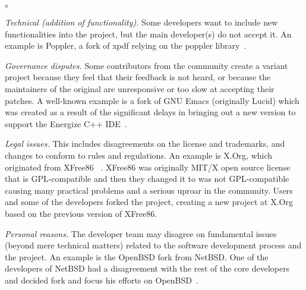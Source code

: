 \begin{list}{$\circ$}{}
   \item \textit{Technical (addition of functionality).} Some developers want to include new functionalities into the project, but the main developer(s) do not accept it. An example is \textsf{Poppler}, a fork of \textsf{xpdf} relying on the \textsf{poppler} library~\cite{Gregorio:2012}.

    \item \textit{Governance disputes.} Some contributors from the community create a variant project because they feel that their feedback is not heard, or because the maintainers of the original are unresponsive or too slow at accepting their patches. A well-known example is a fork of \textsf{GNU Emacs} (originally \textsf{Lucid}) which was created as a result of the significant delays in bringing out a new version to support the Energize C++ IDE~\cite{Wheeler:2015Forking}.

\item \textit{Legal issues.} This includes disagreements on the license and trademarks, and changes to conform to rules and regulations. An example is \textsf{X.Org}, which originated from \textsf{XFree86} ~\cite{Gregorio:2012,Wheeler:2015Forking}. \textsf{XFree86} was originally \textsf{MIT/X} open source license that is GPL-compatible and then they changed it to was not GPL-compatible causing many practical problems and a serious uproar in the community. Users and some of the developers forked the project, creating a new project at \textsf{X.Org} based on the previous version of \textsf{XFree86}.

\item \textit{Personal reasons.} The developer team may disagree on fundamental issues (beyond mere technical matters) related to the software development process and the project. An example is the \textsf{OpenBSD} fork from \textsf{NetBSD}. One of the developers of \textsf{NetBSD} had a disagreement with the rest of the core developers and decided fork and focus his efforts on \textsf{OpenBSD}~\cite{theo:openbsd}.


\end{list}

